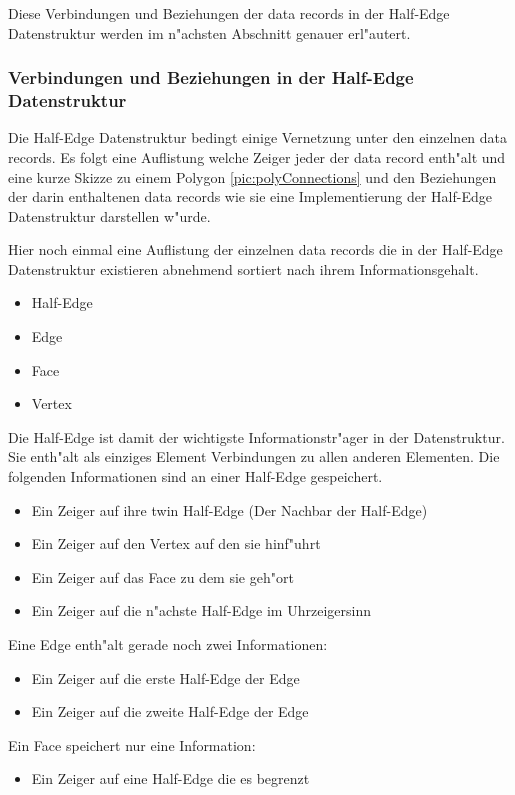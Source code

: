 \documentclass[pagesize, paper=a4, fontsize=12pt,titlepage=true, headings=small, headnosepline, abstractoff, liststotoc, nochapterprefix, plainheadsepline]{scrreprt}
\newcommand{\HES}{Half-Edge Datenstruktur }
\begin{document}
Diese Verbindungen und Beziehungen der data records in der \HES werden im n"achsten Abschnitt genauer erl"autert.

			\subsubsection {Verbindungen und Beziehungen in der \HES}
				Die \HES bedingt einige Vernetzung unter den einzelnen data records. Es folgt eine Auflistung welche Zeiger jeder der data record enth"alt und eine kurze Skizze zu einem Polygon \ref{pic:polyConnections} und den Beziehungen der darin enthaltenen data records wie sie eine Implementierung der \HES darstellen w"urde.

Hier noch einmal eine Auflistung der einzelnen data records die in der \HES existieren abnehmend sortiert nach ihrem Informationsgehalt.
\begin{itemize}
\item Half-Edge
\item Edge
\item Face
\item Vertex
\end{itemize}

Die Half-Edge ist damit der wichtigste Informationstr"ager in der Datenstruktur. Sie enth"alt als einziges Element Verbindungen zu allen anderen Elementen.
Die folgenden Informationen sind an einer Half-Edge gespeichert.
\begin{itemize}
\item Ein Zeiger auf ihre twin Half-Edge (Der Nachbar der Half-Edge)
\item Ein Zeiger auf den Vertex auf den sie hinf"uhrt
\item Ein Zeiger auf das Face zu dem sie geh"ort
\item Ein Zeiger auf die n"achste Half-Edge im Uhrzeigersinn
\end{itemize}

Eine Edge enth"alt gerade noch zwei Informationen:
\begin{itemize}
\item Ein Zeiger auf die erste Half-Edge der Edge
\item Ein Zeiger auf die zweite Half-Edge der Edge
\end{itemize}

Ein Face speichert nur eine Information:
\begin{itemize}
\item Ein Zeiger auf eine Half-Edge die es begrenzt
\end{itemize}
\end{document}
